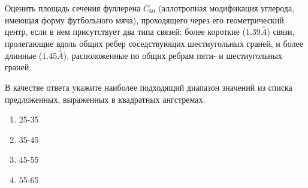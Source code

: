 
Оценить площадь сечения
фуллерена $C_{60}$ (аллотропная модификация углерода, имеющая форму футбольного
мяча), проходящего через его геометрический центр, если в нем присутствует два
типа связей: более короткие ($1.39 \stackrel{\circ}{A}$) связи, пролегающие вдоль общих ребер
соседствующих шестиугольных граней, и более длинные ($1.45 \stackrel{\circ}{A}$), расположенные по
общих ребрам пяти- и шестиугольных граней. 

В качестве ответа укажите наиболее подходящий диапазон значений из списка предложенных, выраженных в квадратных ангстремах.

\begin{enumerate}
    \item 25-35
    \item 35-45
    \item 45-55
    \item 55-65
\end{enumerate}




